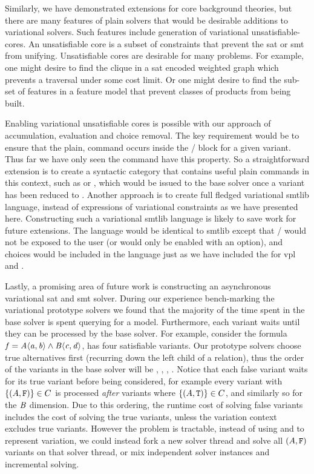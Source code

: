 Similarly, we have demonstrated extensions for core background theories, but
there are many features of plain solvers that would be desirable additions to
variational solvers. Such features include generation of variational
unsatisfiable-cores. An unsatisfiable core is a subset of constraints that
prevent the \ac{sat} or \ac{smt} from unifying. Unsatisfiable cores are
desirable for many problems. For example, one might desire to find the clique in
a \ac{sat} encoded weighted graph which prevents a traversal under some cost
limit. Or one might desire to find the sub-set of features in a feature model
that prevent classes of products from being built.

Enabling variational unsatisfiable cores is possible with our approach of
accumulation, evaluation and choice removal. The key requirement would be to
ensure that the plain,  command occurs inside the
/ block for a given variant. Thus far we have only seen the
 command have this property. So a straightforward extension is to
create a syntactic category that contains useful plain commands in this context,
such as  or , which would be issued to the base
solver once a variant has been reduced to \unit{}. Another approach is to create
full fledged variational \acl{smtlib} language, instead of expressions of
variational constraints as we have presented here. Constructing such a
variational \acl{smtlib} language is likely to save work for future extensions.
The language would be identical to \acl{smtlib} except that /
would not be exposed to the user (or would only be enabled with an option), and
choices would be included in the language just as we have included the for
\ac{vpl} and \evpl{}.

Lastly, a promising area of future work is constructing an asynchronous
variational \ac{sat} and \ac{smt} solver. During our experience bench-marking
the variational prototype solvers we found that the majority of the time spent
in the base solver is spent querying for a model. Furthermore, each variant
waits until they can be processed by the base solver. For example, consider the
formula $\fV{} = \kf{\chc[A]{a,b} \wedge{} \chc[B]{c,d}}$, \fV{} has four
satisfiable variants. Our prototype solvers choose true alternatives first
(recurring down the left child of a relation), thus the order of the variants in
the base solver will be ,
, ,
. Notice that each false variant waits
for its true variant before being considered, for example every variant with
$\set{(A,\fls{})} \in C$ is processed \emph{after} variants where
$\set{(A,\tru{})} \in C$, and similarly so for the $\mathit{B}$ dimension. Due to
this ordering, the runtime cost of solving false variants includes the cost of
solving the true variants, unless the variation context excludes true variants.
However the problem is tractable, instead of using  and  to
represent variation, we could instead fork a new solver thread and solve all
$(A, \texttt{F}{})$ variants on that solver thread, or mix independent solver
instances and incremental solving.

